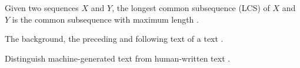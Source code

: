 \begin{definition}
    Given two sequences $X$ and $Y$, the longest common subsequence (LCS) of $X$ and $Y$ is the common subsequence with maximum length \cite{lin_rouge_2004}.
\end{definition}

\begin{definition}
    [context]
    The background, the preceding and following text of a text \cite{gohsen_task_oriented_2024}.
\end{definition}

\begin{definition}
    Distinguish machine-generated text from human-written text \cite{uchendu_authorship_2020}.
\end{definition}